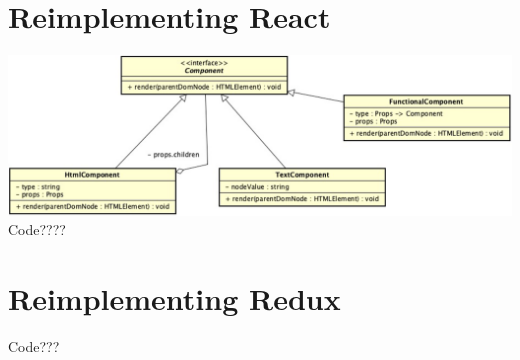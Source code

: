 \section{Reimplementing React}
\includegraphics[width=\linewidth]{./img/react_types.png}\\
Code????
\vspace{0.5cm}
\section{Reimplementing Redux}
\vspace{0.5cm}
Code???
\vspace{0.5cm}

